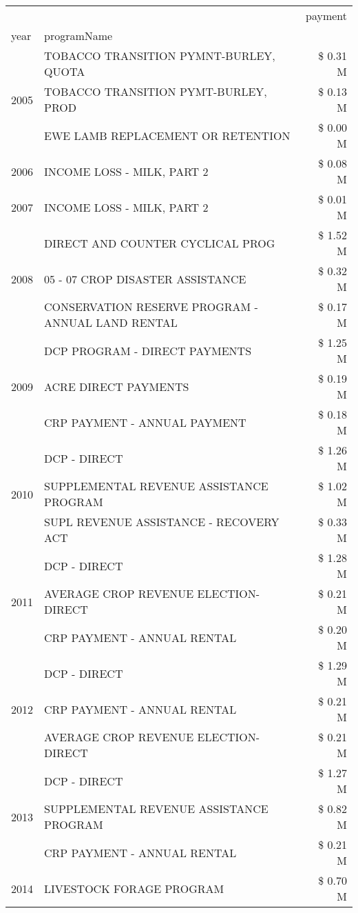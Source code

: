\begin{tabular}{llr}
\toprule
 &  & payment \\
year & programName &  \\
\midrule
\multirow[t]{3}{*}{2005} & TOBACCO TRANSITION PYMNT-BURLEY, QUOTA & \$ 0.31 M \\
 & TOBACCO TRANSITION PYMT-BURLEY, PROD & \$ 0.13 M \\
 & EWE LAMB REPLACEMENT OR RETENTION & \$ 0.00 M \\
\cline{1-3}
2006 & INCOME LOSS - MILK, PART 2 & \$ 0.08 M \\
\cline{1-3}
2007 & INCOME LOSS - MILK, PART 2 & \$ 0.01 M \\
\cline{1-3}
\multirow[t]{3}{*}{2008} & DIRECT AND COUNTER CYCLICAL PROG & \$ 1.52 M \\
 & 05 - 07 CROP DISASTER ASSISTANCE & \$ 0.32 M \\
 & CONSERVATION RESERVE PROGRAM - ANNUAL LAND RENTAL & \$ 0.17 M \\
\cline{1-3}
\multirow[t]{3}{*}{2009} & DCP PROGRAM - DIRECT PAYMENTS & \$ 1.25 M \\
 & ACRE DIRECT PAYMENTS & \$ 0.19 M \\
 & CRP PAYMENT - ANNUAL PAYMENT & \$ 0.18 M \\
\cline{1-3}
\multirow[t]{3}{*}{2010} & DCP - DIRECT & \$ 1.26 M \\
 & SUPPLEMENTAL REVENUE ASSISTANCE PROGRAM & \$ 1.02 M \\
 & SUPL REVENUE ASSISTANCE - RECOVERY ACT & \$ 0.33 M \\
\cline{1-3}
\multirow[t]{3}{*}{2011} & DCP - DIRECT & \$ 1.28 M \\
 & AVERAGE CROP REVENUE ELECTION-DIRECT & \$ 0.21 M \\
 & CRP PAYMENT - ANNUAL RENTAL & \$ 0.20 M \\
\cline{1-3}
\multirow[t]{3}{*}{2012} & DCP - DIRECT & \$ 1.29 M \\
 & CRP PAYMENT - ANNUAL RENTAL & \$ 0.21 M \\
 & AVERAGE CROP REVENUE ELECTION-DIRECT & \$ 0.21 M \\
\cline{1-3}
\multirow[t]{3}{*}{2013} & DCP - DIRECT & \$ 1.27 M \\
 & SUPPLEMENTAL REVENUE ASSISTANCE PROGRAM & \$ 0.82 M \\
 & CRP PAYMENT - ANNUAL RENTAL & \$ 0.21 M \\
\cline{1-3}
\multirow[t]{3}{*}{2014} & LIVESTOCK FORAGE PROGRAM & \$ 0.70 M \\

\end{tabular}
